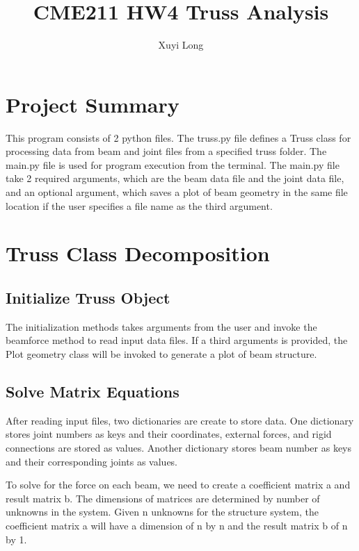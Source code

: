 \documentclass{article}
\title{CME211 HW4 Truss Analysis}
\author{Xuyi Long}
\begin{document}
\maketitle


\section{Project Summary}

This program consists of 2 python files. The truss.py file defines a Truss class for processing data from beam and joint files from a specified truss folder. The main.py file is used for program execution from the terminal.
The main.py file take 2 required arguments, which are the beam data file and the joint data file, and an optional argument, which saves a plot of beam geometry in the same file location if the user specifies a file name as the third argument.



\section{Truss Class Decomposition}

\subsection{Initialize Truss Object}

The initialization methods takes  arguments from the user and invoke the beamforce method to read input data files. If a third arguments is provided, the Plot geometry class will be invoked to generate a plot of beam structure.

\subsection{Solve Matrix Equations}

After reading input files, two dictionaries are create to store data. One dictionary stores joint numbers as keys and their coordinates, external forces, and rigid connections are stored as values. Another dictionary stores beam number as keys and their corresponding joints as values.

To solve for the force on each beam, we need to create a coefficient matrix a and result matrix b. The dimensions of matrices are determined by number of unknowns in the system. Given n unknowns for the structure system, the coefficient matrix a will have a dimension of n by n and the result matrix b of n by 1. 
\end{document}
